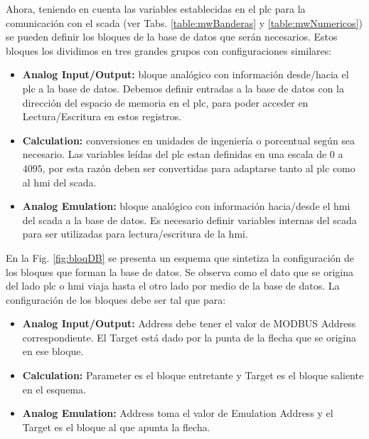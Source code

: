 Ahora, teniendo en cuenta las variables establecidas en el \gls{plc} 
para la comunicación con el \gls{scada} (ver 
Tabs. \ref{table:mwBanderas} y
\ref{table:mwNumericos}) se pueden definir los bloques de la base
de datos que serán necesarios. Estos bloques los dividimos en tres 
grandes grupos con configuraciones similares:
 
\begin{itemize}
 \item \textbf{Analog Input/Output:} bloque analógico con información 
desde/hacia el 
  \gls{plc} a la base de datos. Debemos definir entradas a la base de datos con 
  la dirección del espacio de memoria en el \gls{plc}, para poder acceder en
  Lectura/Escritura en estos registros.
 \item \textbf{Calculation:}  conversiones en unidades de ingeniería o
porcentual
  según sea necesario. Las variables leídas del \gls{plc} estan definidas en 
  una escala de $0$ a $4095$, por esta razón deben ser convertidas para
adaptarse tanto al \gls{plc} como al \gls{hmi} del \gls{scada}.
 \item \textbf{Analog Emulation:} bloque analógico con información hacia/desde
el
  \gls{hmi} del \gls{scada} a la base de datos. Es necesario definir variables 
  internas del \gls{scada} para ser utilizadas para lectura/escritura de la 
  \gls{hmi}.
\end{itemize}

En la Fig. \ref{fig:bloqDB} se presenta un esquema que sintetiza la
configuración de los bloques que forman la base de datos. Se observa
como el dato que se origina del lado \gls{plc} o \gls{hmi} viaja hasta el otro 
lado por medio de la base de datos. La configuración de los bloques debe ser tal 
que para:

\begin{itemize}
  \item \textbf{Analog Input/Output:} Address debe tener el valor de MODBUS
  Address correspondiente. El Target está dado por la punta de la flecha que se
  origina en ese bloque.
  \item \textbf{Calculation:} Parameter es el bloque entretante y Target es el
  bloque saliente en el esquema.
  \item \textbf{Analog Emulation:} Address toma el valor de Emulation Address y
  el Target es el bloque al que apunta la flecha. 
\end{itemize}



